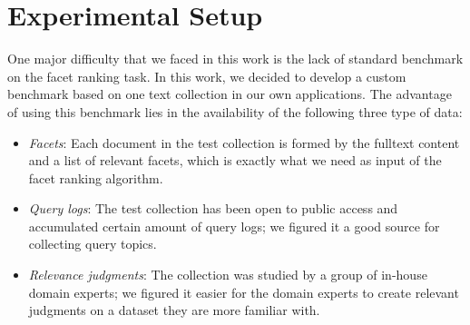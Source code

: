 \section{Experimental Setup}


One major difficulty that we faced in this work is the lack of standard
benchmark on the facet ranking task.  In this work, we decided to develop a
custom benchmark based on one text collection in our own applications.  The
advantage of using this benchmark lies in the availability of the following
three type of data:
\begin{itemize} \item \emph{Facets}: Each document in the test collection is
formed by the fulltext content and a list of relevant facets, which is exactly
what we need as input of the facet ranking algorithm.  \item \emph{Query logs}:
The test collection has been open to public access and accumulated certain
amount of query logs; we figured it a good source for collecting query topics.
\item \emph{Relevance judgments}: The collection was studied by a group of
in-house domain experts; we figured it easier for the domain experts to create
relevant judgments on a dataset they are more familiar with.  \end{itemize}

